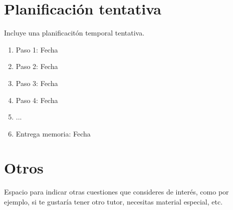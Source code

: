 \documentclass[10pt]{article}
\begin{document}
\section{Planificación tentativa}

Incluye una planificacitón temporal tentativa. 

\begin{enumerate}
  \item Paso 1: Fecha
  \item Paso 2: Fecha
  \item Paso 3: Fecha
  \item Paso 4: Fecha
  \item ...
  \item Entrega memoria: Fecha
\end{enumerate}

\section{Otros}

Espacio para indicar otras cuestiones que consideres de interés, como por ejemplo, si te gustaría tener otro tutor, necesitas material especial, etc.
\end{document}
